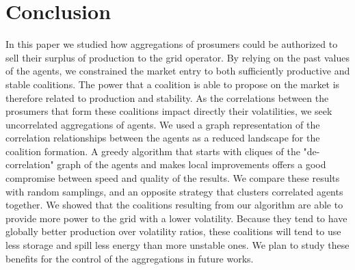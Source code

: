 \documentclass[conference]{IEEEtran}
\begin{document}

%
%
\section{Conclusion}
\label{sec:conclusion}

In this paper we studied how aggregations of prosumers could be authorized to sell their surplus of production to the grid operator. By relying on the past values of the agents, we constrained the market entry to both sufficiently productive and stable coalitions. The power that a coalition is able to propose on the market is therefore related to production and stability. As the correlations between the prosumers that form these coalitions impact directly their volatilities, we seek uncorrelated aggregations of agents. We used a graph representation of the correlation relationships between the agents as a reduced landscape for the coalition formation. A greedy algorithm that starts with cliques of the "de-correlation" graph of the agents and makes local improvements offers a good compromise between speed and quality of the results. We compare these results with random samplings, and an opposite strategy that clusters correlated agents together. We showed that the coalitions resulting from our algorithm are able to provide more power to the grid with a lower volatility. Because they tend to have globally better production over volatility ratios, these coalitions will tend to use less storage and spill less energy than more unstable ones. We plan to study these benefits for the control of the aggregations in future works.
\end{document}
